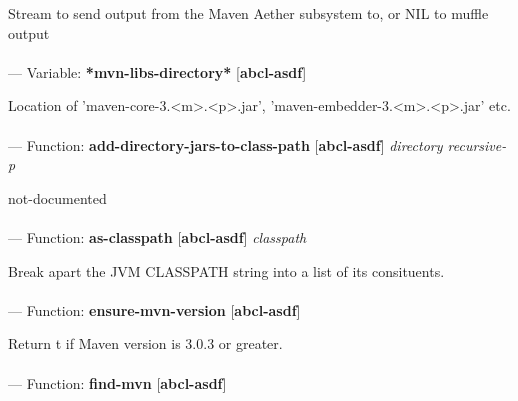 \begin{adjustwidth}{5em}{5em}
Stream to send output from the Maven Aether subsystem to, or NIL to muffle output
\end{adjustwidth}

\paragraph{}
\label{ABCL-ASDF:*MVN-LIBS-DIRECTORY*}
--- Variable: \textbf{*mvn-libs-directory*} [\textbf{abcl-asdf}] \textit{}

\begin{adjustwidth}{5em}{5em}
Location of 'maven-core-3.<m>.<p>.jar', 'maven-embedder-3.<m>.<p>.jar' etc.
\end{adjustwidth}

\paragraph{}
\label{ABCL-ASDF:ADD-DIRECTORY-JARS-TO-CLASS-PATH}
--- Function: \textbf{add-directory-jars-to-class-path} [\textbf{abcl-asdf}] \textit{directory recursive-p}

\begin{adjustwidth}{5em}{5em}
not-documented
\end{adjustwidth}

\paragraph{}
\label{ABCL-ASDF:AS-CLASSPATH}
--- Function: \textbf{as-classpath} [\textbf{abcl-asdf}] \textit{classpath}

\begin{adjustwidth}{5em}{5em}
Break apart the JVM CLASSPATH string into a list of its consituents.
\end{adjustwidth}

\paragraph{}
\label{ABCL-ASDF:ENSURE-MVN-VERSION}
--- Function: \textbf{ensure-mvn-version} [\textbf{abcl-asdf}] \textit{}

\begin{adjustwidth}{5em}{5em}
Return t if Maven version is 3.0.3 or greater.
\end{adjustwidth}

\paragraph{}
\label{ABCL-ASDF:FIND-MVN}
--- Function: \textbf{find-mvn} [\textbf{abcl-asdf}] \textit{}

